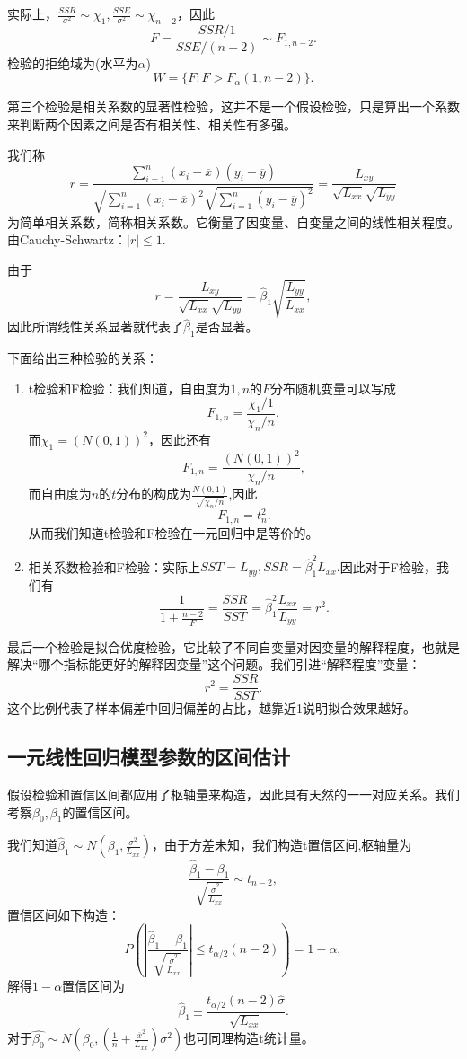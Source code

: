 \documentclass[lang=cn,10pt]{elegantbook}
\begin{document}
    实际上，\(\frac{SSR}{\sigma^2}\sim \chi_1,\frac{SSE}{\sigma^2}\sim \chi_{n-2}\)，因此
    \[F=\frac{SSR/1}{SSE/(n-2)}\sim F_{1,n-2}.\]
    检验的拒绝域为(水平为\(\alpha\))
    \[W=\{F:F>F_{\alpha}(1,n-2)\}.\]

    第三个检验是相关系数的显著性检验，这并不是一个假设检验，只是算出一个系数来判断两个因素之间是否有相关性、相关性有多强。

    我们称
    \[r=\frac{\sum_{i=1}^{n}(x_i-\overline{x})(y_i-\overline{y})}{\sqrt{\sum_{i=1}^{n}(x_i-\overline{x})^2}\sqrt{\sum_{i=1}^{n}(y_i-\overline{y})^2}}=\frac{L_{xy}}{\sqrt{L_{xx}}\sqrt{L_{yy}}}\]
    为简单相关系数，简称相关系数。它衡量了因变量、自变量之间的线性相关程度。由Cauchy-Schwartz：\(|r|\le1.\)

    由于\[r=\frac{L_{xy}}{\sqrt{L_{xx}}\sqrt{L_{yy}}}=\hat{\beta}_1\sqrt{\frac{L_{yy}}{L_{xx}}},\]因此所谓线性关系显著就代表了\(\hat{\beta}_1\)是否显著。

    下面给出三种检验的关系：
    \begin{enumerate}
        \item t检验和F检验：我们知道，自由度为\(1,n\)的\(F\)分布随机变量可以写成\[F_{1,n}=\frac{\chi_1/1}{\chi_n/n},\]而\(\chi_1=(N(0,1))^2\)，因此还有\[F_{1,n}=\frac{(N(0,1))^2}{\chi_n/n},\]而自由度为\(n\)的\(t\)分布的构成为\(\frac{N(0,1)}{\sqrt{\chi_n/n}}\),因此\[F_{1,n}=t_n^2.\]从而我们知道t检验和F检验在一元回归中是等价的。
        \item 相关系数检验和F检验：实际上\(SST=L_{yy},SSR=\hat{\beta}_1^2L_{xx}.\)因此对于F检验，我们有\[\frac{1}{1+\frac{n-2}{F}}=\frac{SSR}{SST}=\hat{\beta}_1^2\frac{L_{xx}}{L_{yy}}=r^2.\]
    \end{enumerate}

    最后一个检验是拟合优度检验，它比较了不同自变量对因变量的解释程度，也就是解决“哪个指标能更好的解释因变量”这个问题。我们引进“解释程度”变量：
    \[r^2=\frac{SSR}{SST}.\]
    这个比例代表了样本偏差中回归偏差的占比，越靠近1说明拟合效果越好。

    \subsection{一元线性回归模型参数的区间估计}
     假设检验和置信区间都应用了枢轴量来构造，因此具有天然的一一对应关系。我们考察\(\beta_0,\beta_1\)的置信区间。

     我们知道\(\hat{\beta}_1\sim N(\beta_1,\frac{\sigma^2}{L_{xx}})\)，由于方差未知，我们构造t置信区间,枢轴量为
     \[\frac{\hat{\beta}_1-\beta_1}{\sqrt{\frac{\hat{\sigma}^2}{L_{xx}}}}\sim t_{n-2},\]
     置信区间如下构造：
     \[P(|\frac{\hat{\beta}_1-\beta_1}{\sqrt{\frac{\hat{\sigma}^2}{L_{xx}}}}|\le t_{\alpha/2}(n-2))=1-\alpha,\]
     解得\(1-\alpha\)置信区间为
     \[\hat{\beta}_1\pm \frac{t_{\alpha/2}(n-2)\hat{\sigma}}{\sqrt{L_{xx}}}.\]
    对于\(\hat{\beta_0}\sim N(\beta_0,(\frac{1}{n}+\frac{\overline{x}^2}{L_{xx}})\sigma^2)\)也可同理构造t统计量。
\end{document}
